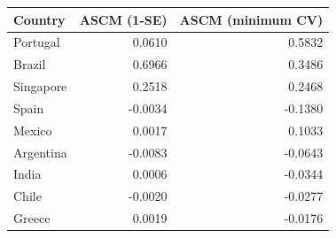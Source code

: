 \begin{tabular}{lrr}
\toprule
Country & ASCM (1-SE) & ASCM (minimum CV) \\
\midrule
Portugal & 0.0610 & 0.5832 \\
Brazil & 0.6966 & 0.3486 \\
Singapore & 0.2518 & 0.2468 \\
Spain & -0.0034 & -0.1380 \\
Mexico & 0.0017 & 0.1033 \\
Argentina & -0.0083 & -0.0643 \\
India & 0.0006 & -0.0344 \\
Chile & -0.0020 & -0.0277 \\
Greece & 0.0019 & -0.0176 \\
\bottomrule
\end{tabular}
